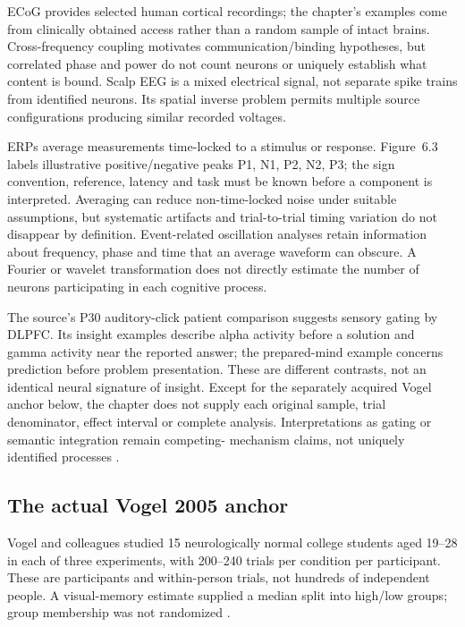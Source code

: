 ECoG provides selected human cortical recordings; the chapter's
examples come from clinically obtained access rather than a
random sample of intact brains. Cross-frequency coupling motivates
communication/binding hypotheses, but correlated phase and power
do not count neurons or uniquely establish what content is bound.
Scalp EEG is a mixed electrical signal, not separate spike trains
from identified neurons. Its spatial inverse problem permits
multiple source configurations producing similar recorded voltages.

ERPs average measurements time-locked to a stimulus or response.
Figure~6.3 labels illustrative positive/negative peaks P1, N1, P2, N2, P3;
the sign convention, reference, latency and task must be known before
a component is interpreted. Averaging can reduce non-time-locked
noise under suitable assumptions, but systematic artifacts and
trial-to-trial timing variation do not disappear by definition.
Event-related oscillation analyses retain information about frequency,
phase and time that an average waveform can obscure. A Fourier
or wavelet transformation does not directly estimate the number
of neurons participating in each cognitive process.

The source's P30 auditory-click patient comparison suggests sensory
gating by DLPFC. Its insight examples describe alpha activity
before a solution and gamma activity near the reported answer;
the prepared-mind example concerns prediction before problem
presentation. These are different contrasts, not an identical
neural signature of insight. Except for the separately acquired
Vogel anchor below, the chapter does not supply each original
sample, trial denominator, effect interval or complete analysis.
Interpretations as gating or semantic integration remain competing-
mechanism claims, not uniquely identified processes
\cite[pp.~75--77]{MorrisonKnowlton2012Methods}.

\subsection{The actual Vogel 2005 anchor}

Vogel and colleagues studied 15 neurologically normal college
students aged 19--28 in each of three experiments, with 200--240
trials per condition per participant. These are participants and
within-person trials, not hundreds of independent people. A
visual-memory estimate supplied a median split into
high/low groups; group membership was not randomized
\cite[pp.~500--503]{VogelEtAl2005Selection}.

